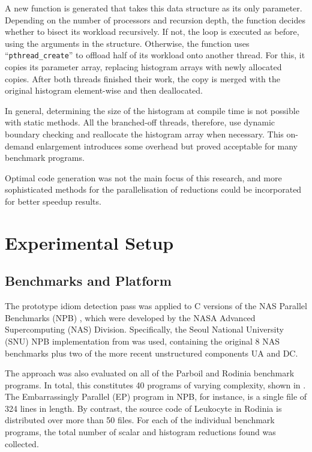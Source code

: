     A new function is generated that takes this data structure as its only
    parameter.
    Depending on the number of processors and recursion depth, the function
    decides whether to bisect its workload recursively.
    If not, the loop is executed as before, using the arguments in the
    structure.
    Otherwise, the function uses ``\texttt{pthread\_create}'' to offload half of
    its workload onto another thread.
    For this, it copies its parameter array, replacing histogram arrays with
    newly allocated copies.
    After both threads finished their work, the copy is merged with the original
    histogram element-wise and then deallocated.

    In general, determining the size of the histogram at compile time is not
    possible with static methods.
    All the branched-off threads, therefore, use dynamic boundary checking and
    reallocate the histogram array when necessary.
    This on-demand enlargement introduces some overhead but proved acceptable
    for many benchmark programs.

    Optimal code generation was not the main focus of this research, and more
    sophisticated methods for the parallelisation of reductions could be
    incorporated for better speedup results.

\section{Experimental Setup}

\subsection{Benchmarks and Platform}

    The prototype idiom detection pass was applied to C versions of the
    NAS Parallel Benchmarks (NPB) \citep{Bailey1991NPB}, which were developed
    by the NASA Advanced Supercomputing (NAS) Division.
    Specifically, the Seoul National University (SNU) NPB implementation from
    \citet{seo2011performance} was used, containing the original 8 NAS
    benchmarks plus two of the more recent unstructured components UA and DC.

    The approach was also evaluated on all of the Parboil \citep{Stratton2018}
    and Rodinia \citep{Che2009Rodinia} benchmark programs.
    In total, this constitutes 40 programs of varying complexity, shown in
    .
    The Embarrassingly Parallel (EP) program in NPB, for instance, is a single
    file of 324 lines in length.
    By contrast, the source code of Leukocyte in Rodinia is distributed over
    more than 50 files.
    For each of the individual benchmark programs, the total number of scalar
    and histogram reductions found was collected.

